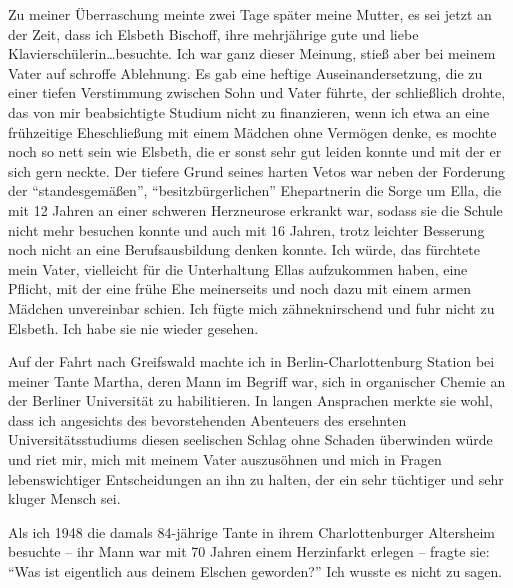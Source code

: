 Zu meiner Überraschung meinte zwei Tage später meine Mutter, es sei jetzt an der Zeit, dass ich Elsbeth Bischoff, ihre mehrjährige gute und liebe Klavierschülerin\dots besuchte. Ich war ganz dieser Meinung, stieß aber bei meinem Vater auf schroffe Ablehnung. Es gab eine heftige Auseinandersetzung, die zu einer tiefen Verstimmung zwischen Sohn und Vater führte, der schließlich drohte, das von mir beabsichtigte Studium nicht zu finanzieren, wenn ich etwa an eine frühzeitige Eheschließung mit einem Mädchen ohne Vermögen denke, es mochte noch so nett sein wie Elsbeth, die er sonst sehr gut leiden konnte und mit der er sich gern neckte. Der tiefere Grund seines harten Vetos war neben der Forderung der \enquote{standesgemäßen}, \enquote{besitzbürgerlichen} Ehepartnerin die Sorge um Ella, die mit 12 Jahren an einer schweren Herzneurose erkrankt war, sodass sie die Schule nicht mehr besuchen konnte und auch mit 16 Jahren, trotz leichter Besserung noch nicht an eine Berufsausbildung denken konnte. Ich würde, das fürchtete mein Vater, vielleicht für die Unterhaltung Ellas aufzukommen haben, eine Pflicht, mit der eine frühe Ehe meinerseits und noch dazu mit einem armen Mädchen unvereinbar schien. Ich fügte mich zähneknirschend und fuhr nicht zu Elsbeth. Ich habe sie nie wieder gesehen.

Auf der Fahrt nach Greifswald machte ich in Berlin-Charlottenburg Station bei meiner Tante Martha, deren Mann im Begriff war, sich in organischer Chemie an der Berliner Universität zu habilitieren. In langen Ansprachen merkte sie wohl, dass ich angesichts des bevorstehenden Abenteuers des ersehnten Universitätsstudiums diesen seelischen Schlag ohne Schaden überwinden würde und riet mir, mich mit meinem Vater auszusöhnen und mich in Fragen lebenswichtiger Entscheidungen an ihn zu halten, der ein sehr tüchtiger und sehr kluger Mensch sei.

Als ich 1948 die damals 84-jährige Tante in ihrem Charlottenburger Altersheim besuchte -- ihr Mann war mit 70 Jahren einem Herzinfarkt erlegen -- fragte sie: \enquote{Was ist eigentlich aus deinem Elschen geworden?} Ich wusste es nicht zu sagen.
